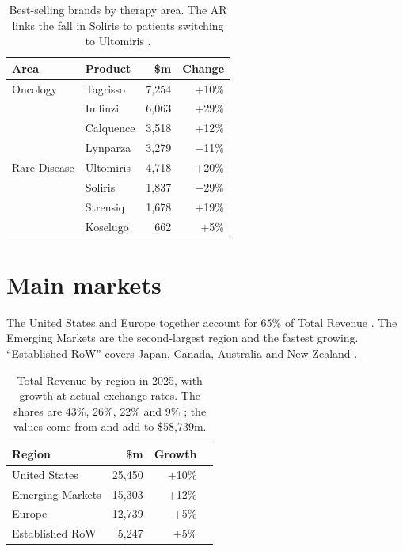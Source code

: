 \begin{table}[H]\centering
\caption{Best-selling brands by therapy area. The AR links the fall in Soliris to patients switching to Ultomiris \cite[pp.~24, 56]{AR}.}
\label{tab:marcas}
\begin{tabular}{@{}llrr@{}}
\toprule
\textbf{Area} & \textbf{Product} & \textbf{\$m} & \textbf{Change} \\
\midrule
Oncology \cite[p.~13]{AR}     & Tagrisso  & 7,254 & +10\% \\
                              & Imfinzi   & 6,063 & +29\% \\
                              & Calquence & 3,518 & +12\% \\
                              & Lynparza  & 3,279 & $-$11\% \\
\addlinespace
Rare Disease \cite[p.~23]{AR} & Ultomiris & 4,718 & +20\% \\
                              & Soliris   & 1,837 & $-$29\% \\
                              & Strensiq  & 1,678 & +19\% \\
                              & Koselugo  &   662 &  +5\% \\
\bottomrule
\end{tabular}
\end{table}
\section{Main markets}

The United States and Europe together account for 65\% of Total Revenue \cite[p.~2]{AR}. The Emerging Markets are the second-largest region and the fastest growing. ``Established RoW'' covers Japan, Canada, Australia and New Zealand \cite[p.~33]{AR}.

\begin{table}[H]\centering
\caption{Total Revenue by region in 2025, with growth at actual exchange rates. The shares are 43\%, 26\%, 22\% and 9\% \cite[p.~2]{AR}; the values come from \cite[p.~32]{AR} and add to \$58,739m.}
\label{tab:receita-regiao}
\begin{tabular}{@{}lrrB@{}}
\toprule
\textbf{Region} & \textbf{\$m} & \textbf{Growth} & \\
\midrule
United States    & 25,450 & +10\% &  \\
Emerging Markets & 15,303 & +12\% &  \\
Europe           & 12,739 &  +5\% &  \\
Established RoW  &  5,247 &  +5\% &  \\
\bottomrule
\end{tabular}
\end{table}
